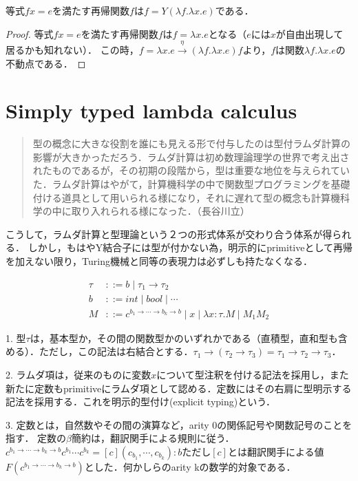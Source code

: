 \documentclass[uplatex, dvipdfmx]{jsreport}
\begin{document}
\begin{proposition}
    等式$fx=e$を満たす再帰関数$f$は$f=Y(\lambda f.\lambda x.e)$である．
\end{proposition}
\begin{proof}
    等式$fx=e$を満たす再帰関数$f$は$f=\lambda x.e$となる（$e$には$x$が自由出現して居るかも知れない）．
    この時，$f=\lambda x.e\xrightarrow{\eta}(\lambda f.\lambda x.e)f$より，$f$は関数$\lambda f.\lambda x.e$の不動点である．
\end{proof}

\section{Simply typed lambda calculus}
\begin{quotation}
    型の概念に大きな役割を誰にも見える形で付与したのは型付ラムダ計算の影響が大きかっただろう．ラムダ計算は初め数理論理学の世界で考え出されたものであるが，その初期の段階から，型は重要な地位を与えられていた．ラムダ計算はやがて，計算機科学の中で関数型プログラミングを基礎付ける道具として用いられる様になり，それに遅れて型の概念も計算機科学の中に取り入れられる様になった．（長谷川立）
\end{quotation}
こうして，ラムダ計算と型理論という２つの形式体系が交わり合う体系が得られる．
しかし，もはやY結合子には型が付かない為，明示的にprimitiveとして再帰を加えない限り，Turing機械と同等の表現力は必ずしも持たなくなる．

\begin{shadebox}
    \begin{definition}[明示的に型付けされた単純型付きラムダ計算]
        \begin{align*}
            \tau &::= b\mid \tau_1\to\tau_2\\
            b &::= int\mid bool\mid\cdots \\
            M &::= c^{b_1\to\cdots\to b_k\to b}\mid x\mid \lambda x:\tau.M\mid M_1M_2
        \end{align*}
    \end{definition}
    \begin{remark}
        1. 型$\tau$は，基本型か，その間の関数型かのいずれかである（直積型，直和型も含める）．ただし，この記法は右結合とする．$\tau_1\to(\tau_2\to\tau_3)=\tau_1\to\tau_2\to\tau_3$．

        2. ラムダ項は，従来のものに変数$x$について型注釈を付ける記法を採用し，また新たに定数もprimitiveにラムダ項として認める．定数にはその右肩に型明示する記法を採用する．これを明示的型付け(explicit typing)という．

        3. 定数とは，自然数やその間の演算など，arity 0の関係記号や関数記号のことを指す．
        定数の$\beta$簡約は，翻訳関手による規則に従う．$c^{b_1\to\cdots\to b_k\to b}c^{b_1}\cdots c^{b_k}=[c](c_{b_1},\cdots,c_{b_k}):b$ただし$[c]$とは翻訳関手による値$F(c^{b_1\to\cdots\to b_k\to b})$とした．何かしらのarity kの数学的対象である．
    \end{remark}
\end{shadebox}
\end{document}
